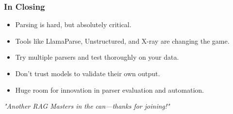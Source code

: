 \begin{frame}[fragile]\frametitle{In Closing}
  \begin{itemize}
    \item Parsing is hard, but absolutely critical.
    \item Tools like LlamaParse, Unstructured, and X-ray are changing the game.
    \item Try multiple parsers and test thoroughly on your data.
    \item Don’t trust models to validate their own output.
    \item Huge room for innovation in parser evaluation and automation.
  \end{itemize}
  \vspace{1em}
  \textit{"Another RAG Masters in the can—thanks for joining!"}
\end{frame}

